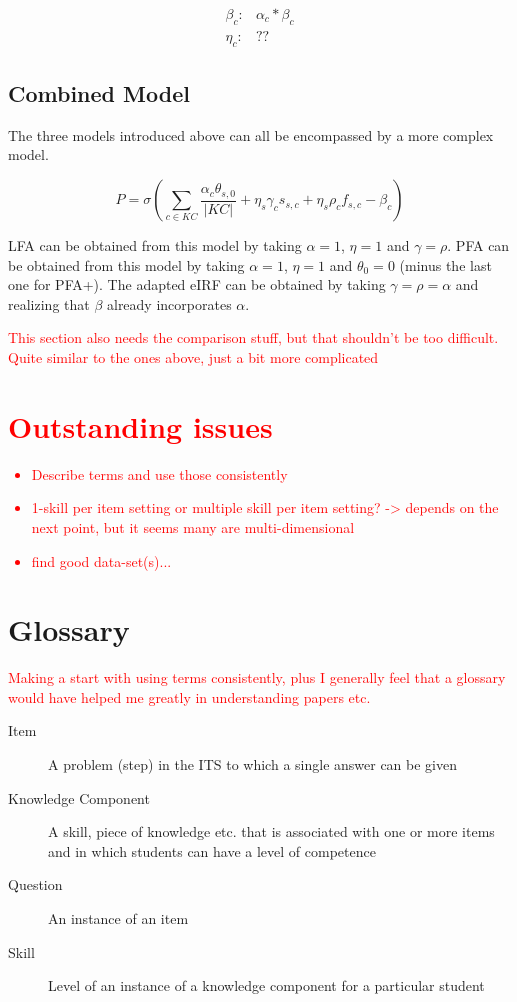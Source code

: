 \documentclass{article}
\newcommand\todo[1]{\textcolor{red}{#1}}
\begin{document}
\begin{equation}
\begin{aligned}
    \beta_{c}:  &  \alpha_{c}*\beta_{c} \\
    \eta_{c}:  &  ??  
\end{aligned}
\end{equation}


\subsection{Combined Model}
The three models introduced above can all be encompassed by a more complex model.

\begin{equation}
P = \sigma(\sum_{c \in KC}\frac{\alpha_c \theta_{s,0}}{|KC|}+\eta_{s} \gamma_{c} s_{s,c} + \eta_{s}\rho_{c} f_{s,c} - \beta_{c})
\end{equation}

LFA can be obtained from this model by taking $\alpha=1$, $\eta=1$ and $\gamma=\rho$. PFA can be obtained from this model by taking $\alpha=1$, $\eta=1$ and $\theta_{0}=0$ (minus the last one for PFA+). The adapted eIRF can be obtained by taking $\gamma=\rho=\alpha$ and realizing that $\beta$ already incorporates $\alpha$.


\todo{
This section also needs the comparison stuff, but that shouldn't be too difficult. Quite similar to the ones above, just a bit more complicated
\section{Outstanding issues}
\begin{itemize}
\item Describe terms and use those consistently
\item 1-skill per item setting or multiple skill per item setting? -> depends on the next point, but it seems many are multi-dimensional
\item find good data-set(s)...
\end{itemize}
}

\newpage
\appendix
\section{Glossary}
\todo{
Making a start with using terms consistently, plus I generally feel that a glossary would have helped me greatly in understanding papers etc.}
\begin{description}
  \item[Item] A problem (step) in the ITS to which a single answer can be given
  \item[Knowledge Component] A skill, piece of knowledge etc. that is associated with one or more items and in which students can have a level of competence
  \item[Question] An instance of an item
  \item[Skill] Level of an instance of a knowledge component for a particular student
\end{description}
\end{document}
